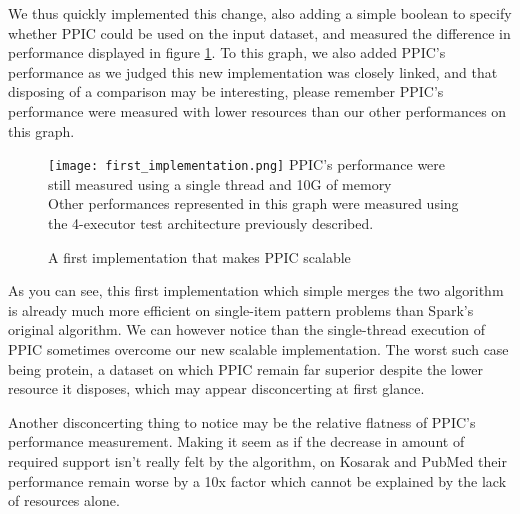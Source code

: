 \documentclass{eplmastersthesis}
\newcommand\danger{%
 \makebox[1.4em][c]{%
 \makebox[0pt][c]{\raisebox{.1em}{\small!}}%
 \makebox[0pt][c]{\color{red}\Large$\bigtriangleup$}}}%
\begin{document}
We thus quickly implemented this change, also adding a simple boolean to specify whether PPIC could be used on the input dataset, and measured the difference in performance displayed in figure \ref{fig:first_scalable_CPbased_implementation}. To this graph, we also added PPIC's performance as we judged this new implementation was closely linked, and that disposing of a comparison may be interesting, please remember PPIC's performance were measured with lower resources than our other performances on this graph.  \newline

\begin{figure}[h]
  \centering
  \texttt{[image: first\_implementation.png]}
  \danger PPIC's performance were still measured using a single thread and 10G of memory \danger \\
  Other performances represented in this graph were measured using the 4-executor test architecture previously described.
  \caption{A first implementation that makes PPIC scalable}
  \label{fig:first_scalable_CPbased_implementation}
\end{figure}

As you can see, this first implementation which simple merges the two algorithm is already much more efficient on single-item pattern problems than Spark's original algorithm. We can however notice than the single-thread execution of PPIC sometimes overcome our new scalable implementation. The worst such case being protein, a dataset on which PPIC remain far superior despite the lower resource it disposes, which may appear disconcerting at first glance. \newline

Another disconcerting thing to notice may be the relative flatness of PPIC's performance measurement. Making it seem as if the decrease in amount of required support isn't really felt by the algorithm, on Kosarak and PubMed their performance remain worse by a 10x factor which cannot be explained by the lack of resources alone. \newline
\end{document}
